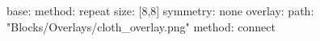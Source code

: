 base:
  method: repeat
  size: [8,8]
  symmetry: none
overlay:
  path: "Blocks/Overlays/cloth_overlay.png"
  method: connect